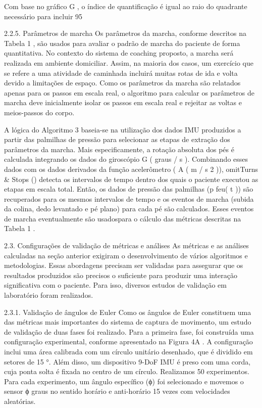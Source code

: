 \documentclass[10pt,a4paper,compsoc]{IEEEtran}
\begin{document}
Com base no gráfico G , o índice de quantificação é igual ao raio do quadrante necessário para incluir 95%

2.2.5. Parâmetros de marcha
Os parâmetros da marcha, conforme descritos na Tabela 1 , são usados ​​para avaliar o padrão de marcha do paciente de forma quantitativa. No contexto do sistema de coaching proposto, a marcha será realizada em ambiente domiciliar. Assim, na maioria dos casos, um exercício que se refere a uma atividade de caminhada incluirá muitas rotas de ida e volta devido a limitações de espaço. Como os parâmetros da marcha são relatados apenas para os passos em escala real, o algoritmo para calcular os parâmetros de marcha deve inicialmente isolar os passos em escala real e rejeitar as voltas e meios-passos do corpo.

A lógica do Algoritmo 3 baseia-se na utilização dos dados IMU produzidos a partir das palmilhas de pressão para selecionar as etapas de extração dos parâmetros da marcha. Mais especificamente, a rotação absoluta dos pés é calculada integrando os dados do giroscópio G ( graus / s ). Combinando esses dados com os dados derivados da função acelerômetro ( A ( m / s 2 )), omitTurns & Stops () detecta os intervalos de tempo dentro dos quais o paciente executou as etapas em escala total. Então, os dados de pressão das palmilhas (p{ f}eu( t )) são recuperados para os mesmos intervalos de tempo e os eventos de marcha (subida da colina, dedo levantado e pé plano) para cada pé são calculados. Esses eventos de marcha eventualmente são usados ​​para o cálculo das métricas descritas na Tabela 1 .

2.3. Configurações de validação de métricas e análises
As métricas e as análises calculadas na seção anterior exigiram o desenvolvimento de vários algoritmos e metodologias. Essas abordagens precisam ser validadas para assegurar que os resultados produzidos são precisos o suficiente para produzir uma interação significativa com o paciente. Para isso, diversos estudos de validação em laboratório foram realizados.

2.3.1. Validação de ângulos de Euler
Como os ângulos de Euler constituem uma das métricas mais importantes do sistema de captura de movimento, um estudo de validação de duas fases foi realizado. Para a primeira fase, foi construída uma configuração experimental, conforme apresentado na Figura 4A . A configuração inclui uma área calibrada com um círculo unitário desenhado, que é dividido em setores de 15 °. Além disso, um dispositivo 9-DoF IMU é preso com uma corda, cuja ponta solta é fixada no centro de um círculo. Realizamos 50 experimentos. Para cada experimento, um ângulo específico (ϕ) foi selecionado e movemos o sensor ϕ graus no sentido horário e anti-horário 15 vezes com velocidades aleatórias.
\end{document}
